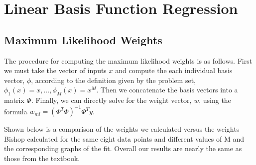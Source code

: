 \documentclass[10pt,twocolumn]{article}
\begin{document}
\section{Linear Basis Function Regression}

\subsection*{Maximum Likelihood Weights}

The procedure for computing the maximum likelihood weights is as follows. First we must take the vector of inputs $x$ and compute the each individual basis vector, $\phi$, according to the definition given by the problem set, $\phi_1(x) = x, ... , \phi_M(x) = x^M$. Then we concatenate the basis vectors into a matrix $\Phi$. Finally, we can directly solve for the weight vector, $w$, using the formula $w_{ml} = (\Phi^T  \Phi)^{-1}  \Phi^T y$.

Shown below is a comparison of the weights we calculated versus the weights Bishop calculated for the same eight data points and different values of M and the corresponding graphs of the fit. Overall our results are nearly the same as those from the textbook.
\end{document}
